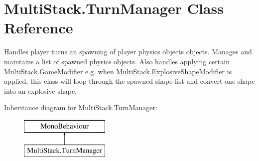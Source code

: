 \hypertarget{class_multi_stack_1_1_turn_manager}{}\section{Multi\+Stack.\+Turn\+Manager Class Reference}
\label{class_multi_stack_1_1_turn_manager}


Handles player turns an spawning of player physics objects objects. Manages and maintains a list of spawned physics objects. Also handles applying certain \hyperlink{class_multi_stack_1_1_game_modifier}{Multi\+Stack.\+Game\+Modifier} e.\+g. when \hyperlink{class_multi_stack_1_1_explosive_shape_modifier}{Multi\+Stack.\+Explosive\+Shape\+Modifier} is applied, this class will loop through the spawned shape list and convert one shape into an explosive shape.  


Inheritance diagram for Multi\+Stack.\+Turn\+Manager\+:\begin{figure}[H]
\begin{center}
\leavevmode
\includegraphics[height=2.000000cm]{class_multi_stack_1_1_turn_manager}
\end{center}
\end{figure}
